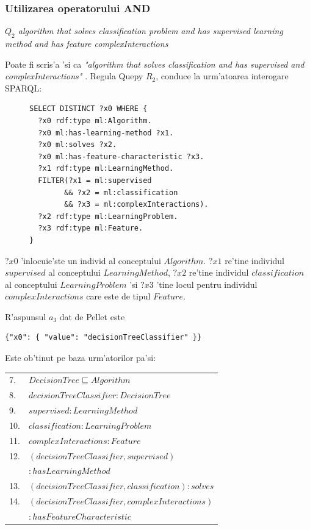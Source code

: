 \documentclass[12pt,a4paper,twoside]{report}
\begin{document}
\subsubsection{Utilizarea operatorului AND}

{\it $Q_2$ algorithm that solves classification problem and has supervised learning method and has feature complexInteractions}

Poate fi scris'a 'si ca {\it "algorithm that solves classification and has supervised and complexInteractions" }. Regula Quepy $R_2$, conduce la urm'atoarea interogare SPARQL:
\begin{figure}[h]
\begin{footnotesize}
\begin{lstlisting}[captionpos=b, caption=Q2 SPARQL query, label=lst:sparql,  basicstyle=\ttfamily,frame=single]
SELECT DISTINCT ?x0 WHERE {
  ?x0 rdf:type ml:Algorithm.
  ?x0 ml:has-learning-method ?x1.
  ?x0 ml:solves ?x2.
  ?x0 ml:has-feature-characteristic ?x3.
  ?x1 rdf:type ml:LearningMethod.
  FILTER(?x1 = ml:supervised 
        && ?x2 = ml:classification 
        && ?x3 = ml:complexInteractions).
  ?x2 rdf:type ml:LearningProblem.
  ?x3 rdf:type ml:Feature.
}
\end{lstlisting}
\end{footnotesize}
\end{figure}

$?x0$ 'inlocuie'ste un individ al conceptului $Algorithm$. $?x1$ re'tine individul $supervised$ al conceptului $LearningMethod$, $?x2$ re'tine individul $classification$ al conceptului $LearningProblem$ 'si $?x3$ 'tine locul pentru individul $complexInteractions$ care este de tipul $Feature$.

R'aspunsul $a_3$ dat de Pellet este
\newline
\begin{lstlisting}[basicstyle=\footnotesize]
{"x0": { "value": "decisionTreeClassifier" }}
\end{lstlisting}

Este ob'tinut pe baza urm'atorilor pa'si:

\vspace*{0.3cm}
\begin{small}
\begin{tabular}{ll}
7. & $DecisionTree  \sqsubseteq Algorithm$\\
8. & $decisionTreeClassifier:DecisionTree$\\
9. & $supervised: LearningMethod$\\
10. & $classification: LearningProblem$\\
11. & $complexInteractions: Feature$\\
12. & $(decisionTreeClassifier,supervised)$\\
    & $     : hasLearningMethod$\\
13. & $(decisionTreeClassifier,classification): solves$\\
14. & $(decisionTreeClassifier,complexInteractions)$\\
    & $     :hasFeatureCharacteristic$\\
\end{tabular}
\end{small}
\vspace*{0.3cm}
\end{document}
